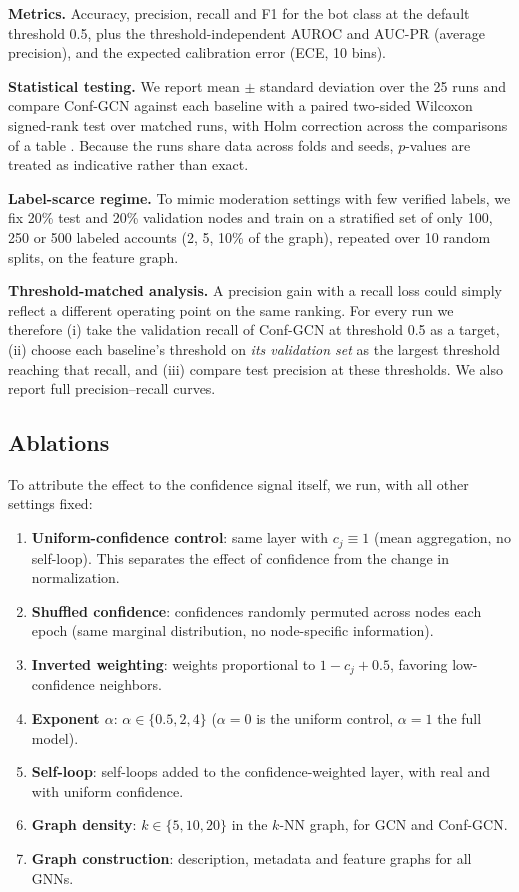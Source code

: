 \documentclass[conference]{IEEEtran}
\begin{document}
\textbf{Metrics.} Accuracy, precision, recall and F1 for the bot class at the default threshold 0.5, plus the threshold-independent AUROC and AUC-PR (average precision), and the expected calibration error (ECE, 10 bins).

\textbf{Statistical testing.} We report mean $\pm$ standard deviation over the 25 runs and compare Conf-GCN against each baseline with a paired two-sided Wilcoxon signed-rank test over matched runs, with Holm correction across the comparisons of a table \cite{demsar2006statistical,holm1979simple}. Because the runs share data across folds and seeds, $p$-values are treated as indicative rather than exact.

\textbf{Label-scarce regime.} To mimic moderation settings with few verified labels, we fix 20\% test and 20\% validation nodes and train on a stratified set of only 100, 250 or 500 labeled accounts (2, 5, 10\% of the graph), repeated over 10 random splits, on the feature graph.

\textbf{Threshold-matched analysis.} A precision gain with a recall loss could simply reflect a different operating point on the same ranking. For every run we therefore (i) take the validation recall of Conf-GCN at threshold 0.5 as a target, (ii) choose each baseline's threshold on \emph{its validation set} as the largest threshold reaching that recall, and (iii) compare test precision at these thresholds. We also report full precision--recall curves.

\subsection{Ablations}
\label{sec:ablations}
To attribute the effect to the confidence signal itself, we run, with all other settings fixed:
\begin{enumerate}
\item \textbf{Uniform-confidence control}: same layer with $c_j\equiv1$ (mean aggregation, no self-loop). This separates the effect of confidence from the change in normalization.
\item \textbf{Shuffled confidence}: confidences randomly permuted across nodes each epoch (same marginal distribution, no node-specific information).
\item \textbf{Inverted weighting}: weights proportional to $1-c_j+0.5$, favoring low-confidence neighbors.
\item \textbf{Exponent $\alpha$}: $\alpha\in\{0.5,2,4\}$ ($\alpha=0$ is the uniform control, $\alpha=1$ the full model).
\item \textbf{Self-loop}: self-loops added to the confidence-weighted layer, with real and with uniform confidence.
\item \textbf{Graph density}: $k\in\{5,10,20\}$ in the $k$-NN graph, for GCN and Conf-GCN.
\item \textbf{Graph construction}: description, metadata and feature graphs for all GNNs.
\end{enumerate}
\end{document}
